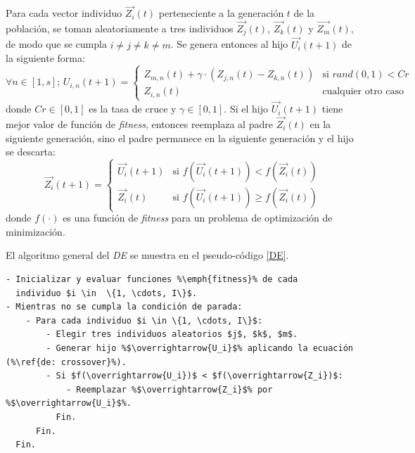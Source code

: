     Para cada vector individuo $\overrightarrow{Z_i}(t)$ perteneciente a la
generación $t$ de la población, se toman aleatoriamente a tres individuos
$\overrightarrow{Z_j}(t)$, $\overrightarrow{Z_k}(t)$ y $\overrightarrow{Z_m}(t)$,
de modo que se cumpla $i \neq j \neq k \neq m$. Se genera entonces al hijo
$\overrightarrow{U_i}(t + 1)$ de la siguiente forma:
\begin{equation} \label{de: crossover}
 \forall n \in [1, s]\text{; }U_{i,n}(t+1) =
 \begin{cases}
   Z_{m,n}(t) + \gamma \cdot (Z_{j,n}(t) - Z_{k,n}(t))  & \text{si } rand(0,1) < Cr\\
   Z_{i,n}(t)                               & \text{cualquier otro caso}
 \end{cases}
\end{equation}
donde $Cr \in [0, 1]$ es la tasa de cruce y $\gamma \in [0, 1]$. Si el
hijo $\overrightarrow{U_i}(t + 1)$ tiene mejor valor de función de \emph{fitness},
entonces reemplaza al padre $\overrightarrow{Z_i}(t)$ en la siguiente generación,
sino el padre permanece en la siguiente generación y el hijo se descarta:
\begin{equation} 
  \overrightarrow{Z_i}(t+1) =
  \begin{cases}
    \overrightarrow{U_i}(t+1) & \text{si } f(\overrightarrow{U_i}(t+1)) < f(\overrightarrow{Z_i}(t)) \\
    \overrightarrow{Z_i}(t)   & \text{si } f(\overrightarrow{U_i}(t+1)) \geq f(\overrightarrow{Z_i}(t))
  \end{cases}
\end{equation}
donde $f(\cdot)$ es una función de \emph{fitness} para un problema de
optimización de minimización.

    El algoritmo general del \emph{DE} se muestra en el pseudo-código \ref{DE}.
\begin{lstlisting}[float=h, caption=Algoritmo General DE \cite{SwAjAm2008}, label=DE]
- Inicializar y evaluar funciones %\emph{fitness}% de cada
  individuo $i \in  \{1, \cdots, I\}$.
- Mientras no se cumpla la condición de parada:
    - Para cada individuo $i \in \{1, \cdots, I\}$:
        - Elegir tres individuos aleatorios $j$, $k$, $m$.
        - Generar hijo %$\overrightarrow{U_i}$% aplicando la ecuación (%\ref{de: crossover}%).
        - Si $f(\overrightarrow{U_i})$ < $f(\overrightarrow{Z_i})$:
            - Reemplazar %$\overrightarrow{Z_i}$% por %$\overrightarrow{U_i}$%.
          Fin.
      Fin.
  Fin.
\end{lstlisting}

